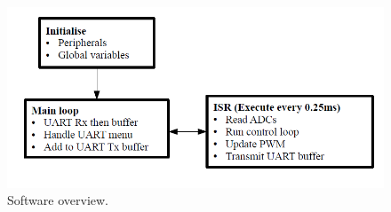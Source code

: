 \documentclass[12pt]{article}%
\begin{document}
\begin{figure}[H]
	\centering
  	\includegraphics[width=12cm]{code.png}
  	\caption{Software overview.}
  	\label{fig:overview}
\end{figure}
\end{document}
